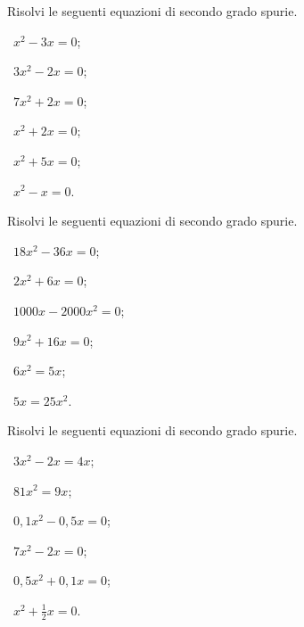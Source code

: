 \begin{esercizio}[\Ast]
\label{ese:3.5}
Risolvi le seguenti equazioni di secondo grado spurie.
\begin{multicols}{3}
 \begin{enumeratea}
 \item~$x^{2} - 3 x = 0$;
 \item~$3 x^{2} - 2 x = 0$;
 \item~$7 x^{2} + 2 x = 0$;
 \item~$x^{2} + 2 x = 0$;
 \item~$x^{2} + 5 x = 0$;
 \item~$x^{2} - x = 0$.
 \end{enumeratea}
 \end{multicols}
\end{esercizio}

\begin{esercizio}[\Ast]
\label{ese:3.6}
Risolvi le seguenti equazioni di secondo grado spurie.
\begin{multicols}{3}
 \begin{enumeratea}
 \item~$18 x^{2} - 36 x = 0$;
 \item~$2x^{2} + 6x = 0$;
 \item~$1000 x - 2000 x^{2} = 0$;
 \item~$9x^{2} + 16x = 0$;
 \item~$6 x^{2} = 5 x$;
 \item~$5x = 25x^{2}$.
 \end{enumeratea}
 \end{multicols}
\end{esercizio}
\newpage
\begin{esercizio}[\Ast]
 \label{ese:3.7}
Risolvi le seguenti equazioni di secondo grado spurie.
\begin{multicols}{3}
 \begin{enumeratea}
 \item~$3 x^{2} - 2 x = 4 x$;
 \item~$81x^{2} = 9x$;
 \item~$0,1 x^{2} - 0,5 x = 0$;
 \item~$7x^{2} - 2x = 0$;
 \item~$0,5 x^{2} + 0,1 x = 0$;
 \item~$x^{2} + \frac{1}{2} x = 0$.
 \end{enumeratea}
 \end{multicols}
\end{esercizio}

